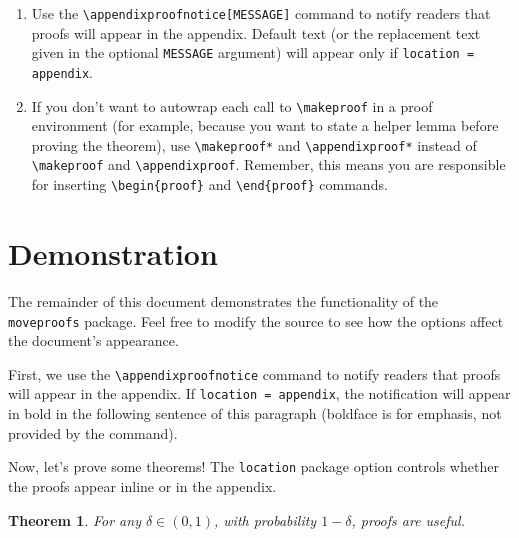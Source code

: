 \documentclass{article}
\newtheorem{theorem}{Theorem}
\begin{document}
\begin{enumerate}
\begin{itemize}
            \begin{itemize}
            \item \texttt{\textbackslash appendixproofsection\{Section Name\}}: creates a section in the appendix that appears only if \texttt{location = appendix}.
            \item \texttt{\textbackslash appendixproof\{theorem\_label\}}: Inserts the proof you wrote inside \texttt{\textbackslash makeproof\{theorem\_label\}} (again, only if \texttt{location = appendix}).
            \end{itemize}
        \end{itemize}
    \item Use the \texttt{\textbackslash appendixproofnotice[MESSAGE]} command to notify readers that proofs will appear in the appendix. Default text (or the replacement text given in the optional \texttt{MESSAGE} argument) will appear only if \texttt{location = appendix}.
    \item If you don't want to autowrap each call to \texttt{\textbackslash makeproof} in a proof environment (for example, because you want to state a helper lemma before proving the theorem), use \texttt{\textbackslash makeproof*} and \texttt{\textbackslash appendixproof*} instead of \texttt{\textbackslash makeproof} and \texttt{\textbackslash appendixproof}. Remember, this means you are responsible for inserting \texttt{\textbackslash begin\{proof\}} and \texttt{\textbackslash end\{proof\}} commands.
\end{enumerate}

\section{Demonstration}
The remainder of this document demonstrates the functionality of the \texttt{moveproofs} package.
Feel free to modify the source to see how the options affect the document's appearance.

First, we use the \texttt{\textbackslash appendixproofnotice} command to notify readers that proofs will appear in the appendix. If \texttt{location = appendix}, the notification will appear in bold in the following sentence of this paragraph (boldface is for emphasis, not provided by the command). \textbf{}

Now, let's prove some theorems! The \texttt{location} package option controls whether the proofs appear inline or in the appendix.

\begin{theorem}\label{theorem_one}
For any $\delta \in (0, 1)$, with probability $1 - \delta$, proofs are useful.
\end{theorem}
\end{document}
